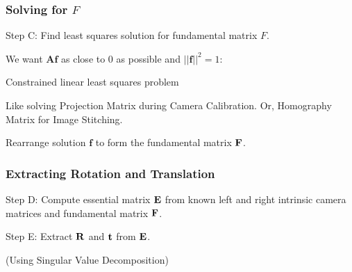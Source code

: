 \begin{frame}
    \frametitle{Solving for $F$}
    
    Step C: Find least squares solution for fundamental matrix $F$.

    \vspace{0.5em} %

    We want $\mathbf{A f}$ as close to 0 as possible and $||\mathbf{f}||^2 = 1$:

    \begin{center}

        Constrained linear least squares problem
    \end{center}

    Like solving Projection Matrix during Camera Calibration. Or, Homography Matrix for Image Stitching.

    Rearrange solution $\mathbf{f}$ to form the fundamental matrix $\boldsymbol{\mathbf{F}}$.
    
\end{frame}

\begin{frame}
    \frametitle{Extracting Rotation and Translation}
    
    Step D: Compute essential matrix $\boldsymbol{\mathbf{E}}$ from known left and right intrinsic camera matrices and fundamental matrix $\boldsymbol{\mathbf{F}}$.

    \begin{center}
    \end{center}

    Step E: Extract $\boldsymbol{\mathbf{R}}$ and $\boldsymbol{\mathbf{t}}$ from $\boldsymbol{\mathbf{E}}$.

    \begin{center}
        \fbox{$\essentialMatrix = \begin{bmatrix} \translation \end{bmatrix}_{\times} \rotation$}

        (Using Singular Value Decomposition)
    \end{center}

\end{frame}


